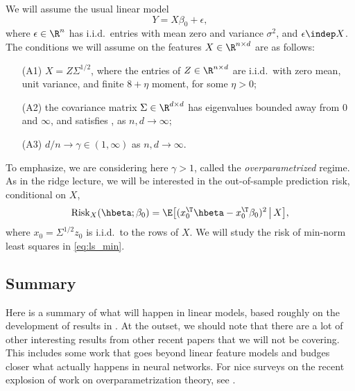 \documentclass{article}
\begin{document}
We will assume the usual linear model 
\begin{equation}
\label{eq:model}
Y = X\beta_0 + \epsilon,
\end{equation}
where $\epsilon \in \R^n$ has i.i.d.\ entries with mean zero and variance
$\sigma^2$, and $\epsilon \indep X$. The conditions we will assume on the
features $X \in \R^{n \times d}$ are as follows:
\begin{itemize}
\item[(A1)] $X = Z \Sigma^{1/2}$, where the entries of $Z \in \R^{n \times d}$
  are i.i.d.\ with zero mean, unit variance, and finite $8+\eta$ moment, for
  some $\eta>0$; 
\item[(A2)] the covariance matrix $\Sigma \in \R^{d \times d}$ has eigenvalues
  bounded away from $0$ and $\infty$, and satisfies ,
  as $n,d \to \infty$; 
\item[(A3)] $d/n \to \gamma \in (1,\infty)$ as $n,d \to \infty$.
\end{itemize}
To emphasize, we are considering here $\gamma > 1$, called the
\emph{overparametrized} regime. As in the ridge lecture, we will be interested
in the out-of-sample prediction risk, conditional on $X$, 
\begin{equation}
\label{eq:risk}
\Risk_X(\hbeta; \beta_0) = \E \big[ ( x_0^\T \hbeta - x_0^\T \beta_0 )^2
\,\big|\, X \big],
\end{equation}
where $x_0 = \Sigma^{1/2} z_0$ is i.i.d.\ to the rows of $X$. We will study the
risk of min-norm least squares in \eqref{eq:ls_min}. 

\subsection{Summary}

Here is a summary of what will happen in linear models, based roughly on the
development of results  in \citet{hastie2022surprises}. At the outset, we should
note that there are a lot of other interesting results from other recent papers
that we will not be covering. This includes some work that goes beyond linear
feature models and budges closer what actually happens in neural networks. For
nice surveys on the recent explosion of work on overparametrization theory, see 
\citet{bartlett2021deep, belkin2021fit, dar2021farewell}.      
\end{document}

